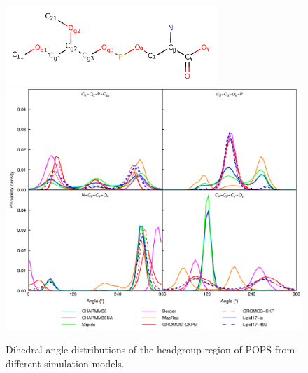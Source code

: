 \documentclass[journal=jpcbfk]{achemso}
\begin{document}
\begin{figure}[]
  \centering
  \includegraphics[width=8.0cm]{../Figs/PS_Labels.png}
  \includegraphics[width=16.0cm]{../Figs/figS7.png}
  \caption{\label{dihedralsHG}
    Dihedral angle distributions of the headgroup region of POPS from different simulation models.
  }
\end{figure}
\end{document}
